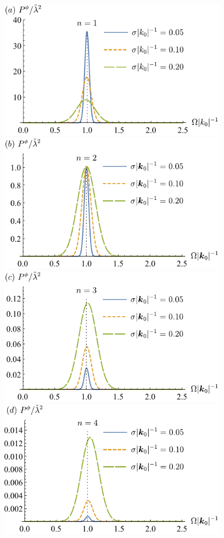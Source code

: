 \documentclass[prd,twocolumn,superscriptaddress,nofootinbib,floatfix,amsmath,amssymb]{revtex4-2}
\begin{document}
    \begin{figure}[tp]
        \includegraphics[scale=0.8]{Fig1a.pdf}
        \includegraphics[scale=0.8]{Fig1b.pdf}
        \includegraphics[scale=0.8]{Fig1c.pdf}
        \includegraphics[scale=0.8]{Fig1d.pdf}

\end{figure}
\end{document}
